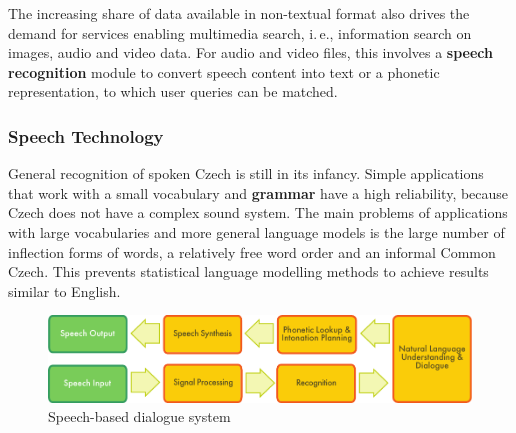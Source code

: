 \begin{multicols}{2}
The increasing share of data available in non-textual format also drives the demand for services enabling multimedia search, i.\,e., information search on images, audio and video data. For audio and video files, this involves a \textbf{speech recognition} module to convert speech content into text or a phonetic representation, to which user queries can be matched.  
  
\subsubsection{Speech Technology}

General recognition of spoken Czech is still in its infancy. Simple applications that work with a small vocabulary and \textbf{grammar} have a high reliability, because Czech does not have a complex sound system. The main problems of applications with large vocabularies and more general language models is the large number of inflection forms of words, a relatively free word order and an informal Common Czech. This prevents statistical language modelling methods to achieve results similar to English.

 \begin{figure}[htb]
  \center
  \includegraphics[width=\textwidth]{../_media/english/simple_speech-based_dialogue_architecture}
  \caption{Speech-based dialogue system}
  \label{fig:dialoguearch_en}
\end{figure}


\end{multicols}
